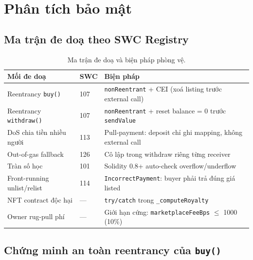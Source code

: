 \documentclass[12pt,a4paper,oneside]{report}
\theoremstyle{plain}
\theoremstyle{definition}
\theoremstyle{remark}
\begin{document}
\chapter{Phân tích bảo mật}
\label{chap:security}

\section{Ma trận đe doạ theo SWC Registry}

\begin{table}[H]
\centering\small
\begin{tabularx}{\textwidth}{p{3.8cm} l X}
\toprule
\textbf{Mối đe doạ} & \textbf{SWC} & \textbf{Biện pháp} \\
\midrule
Reentrancy \texttt{buy()} & 107 & \texttt{nonReentrant} + CEI (xoá listing trước external call) \\
Reentrancy \texttt{withdraw()} & 107 & \texttt{nonReentrant} + reset balance = 0 trước \texttt{sendValue} \\
DoS chia tiền nhiều người & 113 & Pull-payment: deposit chỉ ghi mapping, không external call \\
Out-of-gas fallback & 126 & Cô lập trong withdraw riêng từng receiver \\
Tràn số học & 101 & Solidity 0.8+ auto-check overflow/underflow \\
Front-running unlist/relist & 114 & \texttt{IncorrectPayment}: buyer phải trả đúng giá listed \\
NFT contract độc hại & --- & \texttt{try/catch} trong \texttt{\_computeRoyalty} \\
Owner rug-pull phí & --- & Giới hạn cứng: \texttt{marketplaceFeeBps} $\le$ 1000 (10\%) \\
\bottomrule
\end{tabularx}
\caption{Ma trận đe doạ và biện pháp phòng vệ.}
\end{table}

\section{Chứng minh an toàn reentrancy của \texttt{buy()}}
\end{document}

